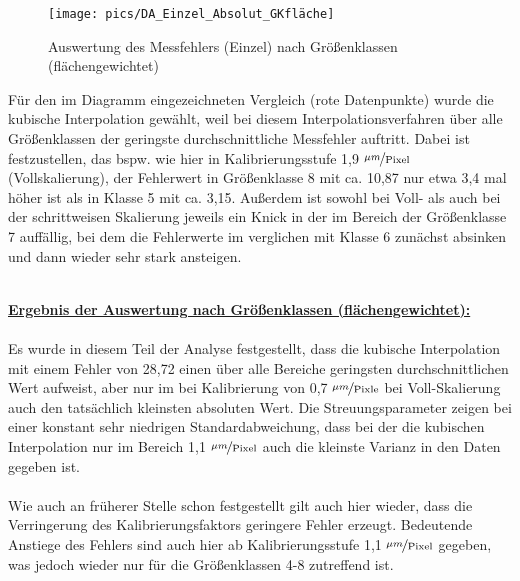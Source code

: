 \documentclass[
fontsize=10pt, 
listof = totoc,
parskip = half	
]{report}
\begin{document}
\begin{figure}[H]
	\centering
	\texttt{[image: pics/DA\_Einzel\_Absolut\_GKfläche]}
	\caption{Auswertung des Messfehlers (Einzel) nach Größenklassen (flächengewichtet)}
	\label{fig:DAEinzelAbsolutGKflaeche}
\end{figure}

\noindent Für den im Diagramm eingezeichneten Vergleich (rote Datenpunkte) wurde die kubische Interpolation gewählt, weil bei diesem Interpolationsverfahren über alle Größenklassen der geringste durchschnittliche Messfehler auftritt. Dabei ist festzustellen, das bspw. wie hier in Kalibrierungsstufe 1,9 $\nicefrac{\mu m}{\text{Pixel}}$ (Vollskalierung), der Fehlerwert in Größenklasse 8 mit ca. 10,87 nur etwa 3,4 mal höher ist als in Klasse 5 mit ca. 3,15. Außerdem ist sowohl bei Voll- als auch bei der schrittweisen Skalierung jeweils ein Knick in der im Bereich der Größenklasse 7 auffällig, bei dem die Fehlerwerte im verglichen mit Klasse 6 zunächst absinken und dann wieder sehr stark ansteigen. 
\\\\
\colorbox{gray!10}{
	\label{box:Ergebnis der Auswertung nach Größenklassen (flächengewichtet):}
	\begin{minipage}{0.975\textwidth}
		\textbf{\underline{Ergebnis der Auswertung nach Größenklassen (flächengewichtet):}}
		\\\\
		Es wurde in diesem Teil der Analyse festgestellt, dass die kubische Interpolation mit einem  Fehler von 28,72 einen über alle Bereiche geringsten durchschnittlichen Wert aufweist, aber nur im bei Kalibrierung von 0,7 $\nicefrac{\mu m}{\text{Pixle}}$ bei Voll-Skalierung auch den tatsächlich kleinsten absoluten Wert. Die Streuungsparameter zeigen bei einer konstant sehr niedrigen Standardabweichung, dass bei der die kubischen Interpolation nur im Bereich 1,1 $\nicefrac{\mu m}{\text{Pixel}}$ auch die kleinste Varianz in den Daten gegeben ist.
		\\\\
		Wie auch an früherer Stelle schon festgestellt gilt auch hier wieder, dass die Verringerung des Kalibrierungsfaktors geringere Fehler erzeugt. Bedeutende Anstiege des Fehlers sind auch hier ab Kalibrierungsstufe 1,1 $\nicefrac{\mu m}{\text{Pixel}}$ gegeben, was jedoch wieder nur für die Größenklassen 4-8 zutreffend ist.
	\end{minipage}
}
	
\end{document}
